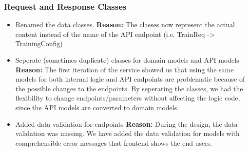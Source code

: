 \subsubsection{Request and Response Classes}
\begin{itemize}
    \item
    Renamed the data classes.
    \newline
    \textbf{Reason:} The classes now represent the actual content instead of the name
    of the API endpoint (i.e. TrainReq -> TrainingConfig)
    \item
    Seperate (sometimes duplicate) classes for domain models and API models
    \newline
    \textbf{Reason:} The first iteration of the service showed us that using the
    same models for both internal logic and API endpoints are problematic because
    of the possible changes to the endpoints. By seperating the classes, we had
    the flexibility to change endpoints/parameters without affecting the logic code,
    since the API models are converted to domain models.
    \item
    Added data validation for endpoints 
    \newline
    \textbf{Reason:} During the design, the data validation was missing. We have
    added the data validation for models with comprehensible error messages that
    frontend shows the end users.
\end{itemize}

